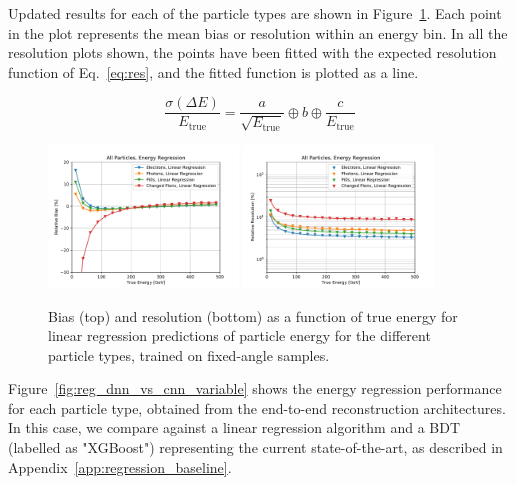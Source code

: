 Updated results for each of the particle types are shown in Figure~\ref{fig:reg_linreg}. Each point in the plot represents the mean bias or resolution within an energy bin. In all the resolution plots shown, the points have been fitted with the expected resolution function of Eq.~\ref{eq:res}, and the fitted function is plotted as a line.

\begin{equation}
\frac{\sigma(\Delta E)}{E_{\text{true}}} = \frac{a}{\sqrt{E_{\text{true}}}} \oplus b \oplus \frac{c}{E_{\text{true}}}
\label{eq:res}
\end{equation}

\begin{figure}[htbp]
\centering
\includegraphics[width=0.45\textwidth]{Images/Calo/bias_vs_E_allparts_linreg.pdf}
\includegraphics[width=0.45\textwidth]{Images/Calo/res_vs_E_allparts_linreg_fits.pdf}
\caption{Bias (top) and resolution (bottom) as a function of true energy for linear regression predictions of particle energy for the different particle types, trained on fixed-angle samples. \label{fig:reg_linreg}}
\end{figure}

Figure~\ref{fig:reg_dnn_vs_cnn_variable} shows the energy regression performance for each particle type, obtained from the end-to-end reconstruction architectures. In this case, we compare against a linear regression algorithm and a BDT (labelled as "XGBoost") representing the current state-of-the-art, as described in Appendix~\ref{app:regression_baseline}. 

